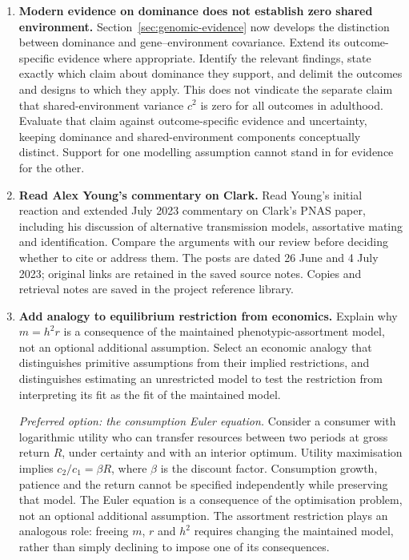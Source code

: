 \documentclass[12pt]{article}
\renewenvironment{itemize}{\begin{enumerate}}{\end{enumerate}}
\begin{document}
\begin{itemize}
\item \textbf{Modern evidence on dominance does not establish zero shared environment.}
Section~\ref{sec:genomic-evidence} now develops the distinction between
dominance and gene--environment covariance. Extend its outcome-specific
evidence where appropriate. Identify the relevant findings,
state exactly which claim about dominance they support, and delimit
the outcomes and designs to which they apply. This does not vindicate
the separate claim that shared-environment variance $c^2$ is zero for
all outcomes in adulthood. Evaluate that claim against outcome-specific
evidence and uncertainty, keeping dominance and shared-environment
components conceptually distinct. Support for one modelling assumption
cannot stand in for evidence for the other.
\item \textbf{Read Alex Young's commentary on Clark.}
Read Young's initial reaction and extended July 2023 commentary on
Clark's PNAS paper, including his discussion of alternative transmission
models, assortative mating and identification. Compare the arguments
with our review before deciding whether to cite or address them.
The posts are dated 26 June and 4 July 2023; original links are retained
in the saved source notes.
Copies and retrieval notes are saved in the project reference library.

\item \textbf{Add analogy to equilibrium restriction from economics.}
Explain why $m=h^2r$ is a consequence of the maintained phenotypic-assortment
model, not an optional additional assumption. Select an economic analogy
that distinguishes primitive assumptions from their implied restrictions,
and distinguishes estimating an unrestricted model to test the restriction
from interpreting its fit as the fit of the maintained model.


\par\medskip
\textit{Preferred option: the consumption Euler equation.}
Consider a consumer with logarithmic utility who can transfer resources
between two periods at gross return $R$, under certainty and with an
interior optimum. Utility maximisation implies $c_2/c_1=\beta R$, where
$\beta$ is the discount factor. Consumption growth, patience and the
return cannot be specified independently while preserving that model.
The Euler equation is a consequence of the optimisation problem, not
an optional additional assumption. The assortment restriction plays an
analogous role: freeing $m$, $r$ and $h^2$ requires changing the maintained
model, rather than simply declining to impose one of its consequences.


\end{itemize}
\end{document}

